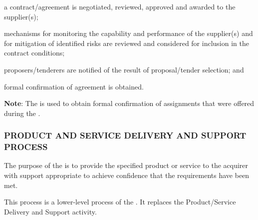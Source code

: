 			\begin{adjustwidth}{2em}{0pt} 

				\begin{compactitem}

					\item a contract/agreement is negotiated, reviewed, approved and awarded to the supplier(s);

					\item mechanisms for monitoring the capability and performance of the supplier(s) and for mitigation of identified risks are reviewed and considered for inclusion in the contract conditions;

					\item proposers/tenderers are notified of the result of proposal/tender selection; and

					\item formal confirmation of agreement is obtained.

				\end{compactitem}

			{\bf Note}: The  is used to obtain formal confirmation of assignments that were offered during the .


			\end{adjustwidth}

		\subsubsection{PRODUCT AND SERVICE DELIVERY AND SUPPORT PROCESS\label{llproc:product_and_service_delivery_and_support_process}}

			\begin{adjustwidth}{2em}{0pt} 

				The purpose of the  is to provide the specified product or service to the acquirer with support appropriate to achieve confidence that the requirements have been met.

				This process is a lower-level process of the . It replaces the Product/Service Delivery and Support activity.

			\end{adjustwidth}

